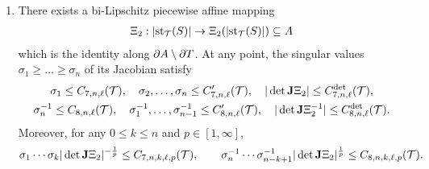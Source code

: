 \documentclass[10pt,a4paper]{article}
\begin{document}
\begin{proposition}
\begin{enumerate}
    \item 
    There exists a bi-Lipschitz piecewise affine mapping
    \begin{align*}
        \Xi_{2} : \left| \operatorname{st}_{{\mathcal T}}(S) \right| \rightarrow \Xi_{2}( \left| \operatorname{st}_{{\mathcal T}}(S) \right| ) \subseteq A
    \end{align*}
    which is the identity along $\partial A \setminus \partial T$.
    At any point, the singular values $\sigma_1 \geq \dots \geq \sigma_n$ of its Jacobian satisfy 
    \begin{gather*}
        \sigma_1 \leq C_{7,n,\ell}({\mathcal T}),
        \quad 
        \sigma_2,\dots,\sigma_n \leq C'_{7,n,\ell}({\mathcal T}),
        \quad 
        | \det{\mathbf{J}}\Xi_{2} |      \leq C^{\det}_{7,n,\ell}({\mathcal T}),
        \\
        \sigma_n^{-1} \leq C_{8,n,\ell}({\mathcal T}),
        \quad 
        \sigma_1^{-1},\dots,\sigma_{n-1}^{-1} \leq C'_{8,n,\ell}({\mathcal T}),
        \quad 
        | \det{\mathbf{J}}\Xi_{2}^{-1} | \leq C^{\det}_{8,n,\ell}({\mathcal T}).
    \end{gather*}
    Moreover, for any $0 \leq k \leq n$ and $p \in [1,\infty]$,
    \begin{align*}
        \sigma_{1}\cdots\sigma_{k} | \det{\mathbf{J}}\Xi_{2} |^{-\frac 1 p}
        \leq 
        C_{7,n,k,\ell,p}({\mathcal T}),
        \qquad 
        \sigma_{n}^{-1}\cdots\sigma_{n-k+1}^{-1} | \det{\mathbf{J}}\Xi_{2} |^{\frac 1 p}
        \leq 
        C_{8,n,k,\ell,p}({\mathcal T}).
    \end{align*}
    \end{enumerate}
\end{proposition}
\end{document}

